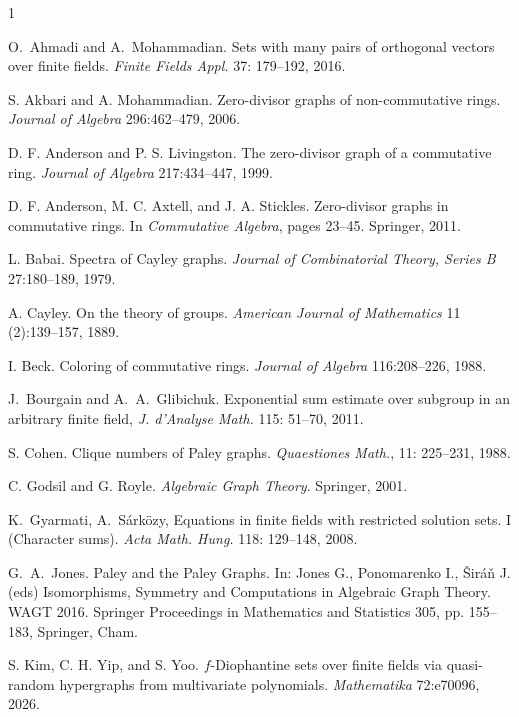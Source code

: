 \documentclass[11pt]{amsart}
\theoremstyle{definition}
\theoremstyle{remark}
\begin{document}
\begin{thebibliography}{1}

 O.~Ahmadi and A.~Mohammadian. Sets with many pairs of orthogonal vectors over
finite fields. {\em Finite Fields Appl.} 37: 179--192, 2016.

 S. Akbari and A. Mohammadian. Zero-divisor graphs of non-commutative rings. {\em Journal of Algebra} 296:462--479, 2006.

 D. F. Anderson and P. S. Livingston. The zero-divisor graph of a commutative ring. {\em Journal of Algebra} 217:434--447, 1999.

 D. F. Anderson, M. C. Axtell, and J. A. Stickles. Zero-divisor graphs in commutative rings. In {\em Commutative Algebra}, pages 23--45. Springer, 2011.

 L. Babai. Spectra of Cayley graphs. {\em Journal of Combinatorial Theory, Series B} 27:180--189, 1979.

 A. Cayley. On the theory of groups. {\em American Journal of Mathematics} 11 (2):139--157, 1889.

 I. Beck. Coloring of commutative rings. {\em Journal of Algebra} 116:208--226, 1988.


  J.~Bourgain and A.~A.~Glibichuk. Exponential sum estimate over subgroup in an arbitrary finite
field, {\em J. d'Analyse Math.} 115: 51--70, 2011.

 S. Cohen. Clique numbers of Paley graphs. {\em Quaestiones Math.}, 11: 225--231, 1988.


 C. Godsil and G. Royle. {\em Algebraic Graph Theory}. Springer, 2001.

 K.~Gyarmati, A.~Sárközy, Equations in finite fields with restricted solution sets. I (Character sums). {\em Acta Math. Hung.} 118: 129--148, 2008.


  G.~A.~Jones. Paley and the Paley Graphs. In: Jones G., Ponomarenko I., \v{S}ir\'{a}\v{n} J.(eds) Isomorphisms, Symmetry and Computations in Algebraic Graph Theory. WAGT 2016. Springer Proceedings in Mathematics and Statistics 305, pp. 155--183, Springer, Cham.

 S. Kim, C. H. Yip, and S. Yoo. $f$-Diophantine sets over finite fields via quasi-random hypergraphs from multivariate polynomials. {\em Mathematika} 72:e70096, 2026.




\end{thebibliography}
\end{document}
